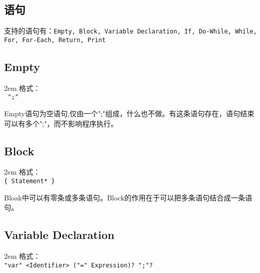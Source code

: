\documentclass[a4paper]{article}
\newcounter{rowno}
\begin{document}
\begin{CJK}{UTF8}{gbsn}
\begin{table}
        \caption{运算符优先级}\label{OperatorPrecedence}
    \end{table}

\section{语句}\label{statment}
    支持的语句有：{\tt Empty, Block, Variable Declaration, If, Do-While, While, For, For-Each, Return, Print}
    \subsection{Empty}
        \hangindent 2em
        格式：\\
        {\tt
        ";"\\
        }

        Empty语句为空语句,仅由一个";"组成，什么也不做。有这条语句存在，语句结束可以有多个";"，而不影响程序执行。

    \subsection{Block}
        \hangindent 2em
        格式：\\
        {\tt\{ Statement* \}}

        Bloak中可以有零条或多条语句。Block的作用在于可以把多条语句结合成一条语句。

    \subsection{Variable Declaration}
        \hangindent 2em
        格式：\\
        {\tt"var" <Identifier> ("=" Expression)? ";"?}


\end{CJK}
\end{document}
